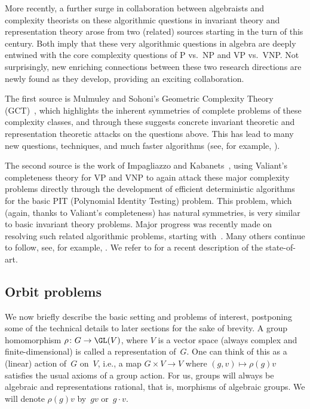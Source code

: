 More recently, a further surge in collaboration between algebraists and complexity theorists on these algorithmic questions in invariant theory
and representation theory arose from two (related) sources starting in the turn of this century.
Both imply that these very algorithmic questions in algebra are deeply entwined with the core complexity questions of P vs.~NP  and VP vs.~VNP.
Not surprisingly, new enriching connections between these two research directions are newly found as they develop, providing an exciting collaboration.

The first source is Mulmuley and Sohoni's Geometric Complexity Theory (GCT)~\cite{mulmuley2001geometric}, which highlights
the inherent symmetries of complete problems of these complexity classes, and through these suggests concrete invariant theoretic and
representation theoretic attacks on the questions above.
This has lead to many new questions, techniques, and much faster algorithms (see, for example, \cite{GCTV,FS,BCMW:17,MW19}).

The second source is the work of Impagliazzo and Kabanets~\cite{KI04}, using Valiant's completeness theory for VP and VNP to again attack these major
complexity problems directly through the development of efficient deterministic algorithms for the basic PIT (Polynomial Identity Testing) problem.
This problem, which (again, thanks to Valiant's completeness) has natural symmetries, is very similar to basic invariant theory problems.
Major progress was recently made on resolving such related algorithmic problems, starting with~\cite{Gur04,GGOW16,IQS,IQS2,DM-poly}.
Many others continue to follow, see, for example, \cite{DM-oc,AZGLOW,GGOW:20,BGOWW,BFGOWW,BLNW:20,BFGOWW2}.
We refer to \cite{BFGOWW2} for a recent description of the state-of-art.

%
\subsection{Orbit problems}\label{subsec:orbit}
%
We now briefly describe the basic setting and problems of interest, postponing some of the technical details to later sections for the sake of brevity.
A group homomorphism $\rho\colon G \rightarrow \GL(V)$, where $V$ is a vector space (always complex and finite-dimensional) is called a representation of~$G$.
One can think of this as a (linear) action of~$G$ on~$V$, i.e., a map $G \times V \rightarrow V$ where $(g,v) \mapsto \rho(g) v$ satisfies the usual axioms of a group action.
For us, groups will always be algebraic and representations rational, that is, morphisms of algebraic groups.
We will denote $\rho(g) v$ by~$gv$ or~$g \cdot v$.

